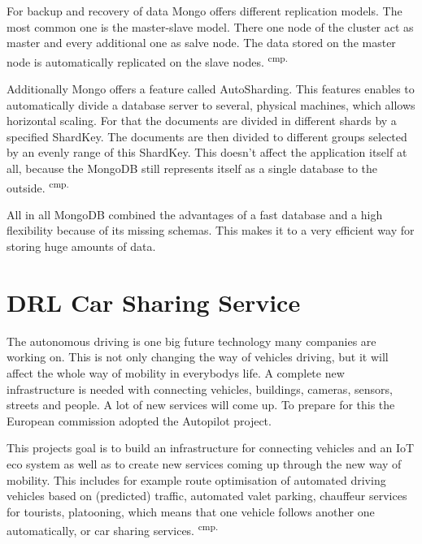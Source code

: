 
For backup and recovery of data Mongo offers different replication models. The most common one is the master-slave model. There one node of the cluster act as master and every additional one as salve node. The data stored on the master node is automatically replicated on the slave nodes. \textsuperscript{cmp.\cite{33}}

Additionally Mongo offers a feature called AutoSharding. This features enables to automatically divide a database server to several, physical machines, which allows horizontal scaling. For that the documents are divided in different shards by a specified ShardKey. The documents are then divided to different groups selected by an evenly range of this ShardKey. This doesn't affect the application itself at all, because the MongoDB still represents itself as a single database to the outside.  \textsuperscript{cmp.\cite{33}}

All in all MongoDB combined the advantages of a fast database and a high flexibility because of its missing schemas. This makes it to a very efficient way for storing huge amounts of data.

\section{DRL Car Sharing Service}

The autonomous driving is one big future technology many companies are working on. This is not only changing the way of vehicles driving, but it will affect the whole way of mobility in everybodys life. A complete new infrastructure is needed with connecting vehicles, buildings, cameras, sensors, streets and people. A lot of new services will come up. To prepare for this the European commission adopted the Autopilot project.

This projects goal is to build an infrastructure for connecting vehicles and an IoT eco system as well as to create new services coming up through the new way of mobility. This includes for example route optimisation of automated driving vehicles based on (predicted) traffic, automated valet parking, chauffeur services for tourists, platooning, which means that one vehicle follows another one automatically, or car sharing services.  \textsuperscript{cmp.\cite{37}}

